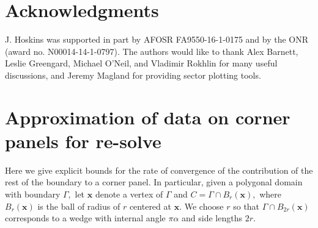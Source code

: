 \documentclass[12pt]{elsarticle}
\newcommand{\bx}{\boldsymbol{x}}
\begin{document}








\section{Acknowledgments}
J. Hoskins was supported in part by AFOSR FA9550-16-1-0175 and by the ONR (award no. N00014-14-1-0797).
The authors would like to thank Alex Barnett, Leslie Greengard, Michael O'Neil, and Vladimir Rokhlin for many useful discussions, and Jeremy Magland for providing sector plotting tools.

\appendix
\section{Approximation of data on corner panels for re-solve}
Here we give explicit bounds for the rate of convergence of the contribution of the rest of the boundary to a corner panel. In particular, given a polygonal domain with boundary $\Gamma,$ let $\bx$ denote a vertex of $\Gamma$ and $C = \Gamma \cap B_r(\bx),$ where $B_r(\bx)$ is the ball of radius of $r$ centered at $\bx.$ We choose $r$ so that $\Gamma \cap B_{2r}(\bx)$ corresponds to a wedge with internal angle $\pi \alpha$ and side lengths $2r.$ 

\end{document}
